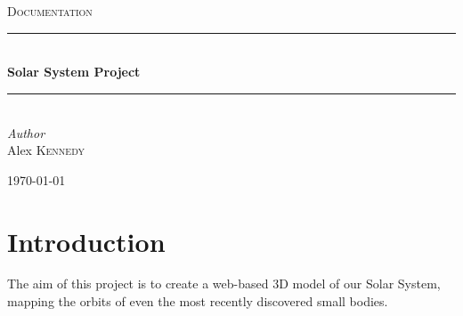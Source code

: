 \documentclass[11pt]{article}
\begin{document}
\begin{titlepage}
	\newcommand{\HRule}{\rule{\linewidth}{0.5mm}} %

	\center


	\textsc{\LARGE}\\[1.5cm] %

	\textsc{\Large }\\[0.5cm] %

	\textsc{\large Documentation}\\[0.5cm] %


	\HRule\\[0.4cm]

	{\huge\bfseries Solar System Project}\\[0.4cm] %

	\HRule\\[1.5cm]


	{\large\textit{Author}}\\
	Alex \textsc{Kennedy} %


	\vfill\vfill\vfill %

	{\large\today} %


	\vfill %

\end{titlepage}

\tableofcontents

\pagebreak

\section{Introduction}
The aim of this project is to create a web-based 3D model of our Solar System, mapping the orbits of even the most recently discovered small bodies.
\end{document}
